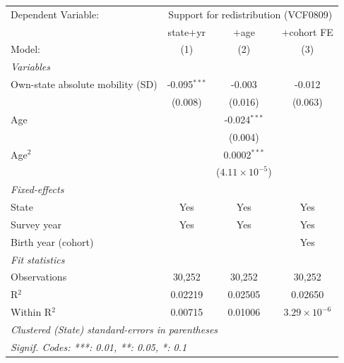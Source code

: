    \begin{tabular}{lccc}
      \tabularnewline \midrule \midrule
      Dependent Variable: & \multicolumn{3}{c}{Support for redistribution (VCF0809)}\\
                                       & state$+$yr     & $+$age                  & $+$cohort FE \\   
      Model:                           & (1)            & (2)                     & (3)\\  
      \midrule
      \emph{Variables}\\
      Own-state absolute mobility (SD) & -0.095$^{***}$ & -0.003                  & -0.012\\   
                                       & (0.008)        & (0.016)                 & (0.063)\\   
      Age                              &                & -0.024$^{***}$          &   \\   
                                       &                & (0.004)                 &   \\   
      Age$^2$                          &                & 0.0002$^{***}$          &   \\   
                                       &                & ($4.11\times 10^{-5}$)  &   \\   
      \midrule
      \emph{Fixed-effects}\\
      State                            & Yes            & Yes                     & Yes\\  
      Survey year                      & Yes            & Yes                     & Yes\\  
      Birth year (cohort)              &                &                         & Yes\\  
      \midrule
      \emph{Fit statistics}\\
      Observations                     & 30,252         & 30,252                  & 30,252\\  
      R$^2$                            & 0.02219        & 0.02505                 & 0.02650\\  
      Within R$^2$                     & 0.00715        & 0.01006                 & $3.29\times 10^{-6}$\\   
      \midrule \midrule
      \multicolumn{4}{l}{\emph{Clustered (State) standard-errors in parentheses}}\\
      \multicolumn{4}{l}{\emph{Signif. Codes: ***: 0.01, **: 0.05, *: 0.1}}\\
   \end{tabular}
\vspace{3pt}\par{}
